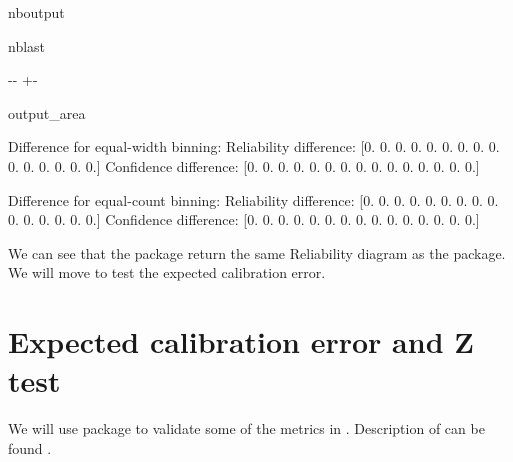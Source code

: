 \documentclass[letterpaper,10pt,english]{sphinxmanual}
\begin{document}
\begin{sphinxuseclass}{nboutput}
\begin{sphinxuseclass}{nblast}
{

\kern-\sphinxverbatimsmallskipamount\kern-\baselineskip
\kern+\FrameHeightAdjust\kern-\fboxrule
\vspace{\nbsphinxcodecellspacing}

\begin{sphinxuseclass}{output_area}
\begin{sphinxuseclass}{}


\begin{sphinxVerbatim}[commandchars=\\\{\}]
Difference for equal-width binning:
Reliability difference: [0. 0. 0. 0. 0. 0. 0. 0. 0. 0. 0. 0. 0. 0. 0.]
Confidence difference: [0. 0. 0. 0. 0. 0. 0. 0. 0. 0. 0. 0. 0. 0. 0.]

Difference for equal-count binning:
Reliability difference: [0. 0. 0. 0. 0. 0. 0. 0. 0. 0. 0. 0. 0. 0. 0.]
Confidence difference: [0. 0. 0. 0. 0. 0. 0. 0. 0. 0. 0. 0. 0. 0. 0.]
\end{sphinxVerbatim}



\end{sphinxuseclass}
\end{sphinxuseclass}
}

\end{sphinxuseclass}
\end{sphinxuseclass}
\sphinxAtStartPar
We can see that the  package return the same Reliability diagram as the  package. We will move to test the expected calibration error.


\section{Expected calibration error and Z test}
\label{\detokenize{notebooks/validation:Expected-calibration-error-and-Z-test}}
\sphinxAtStartPar
We will use  package to validate some of the metrics in . Description of  can be found .
\end{document}
